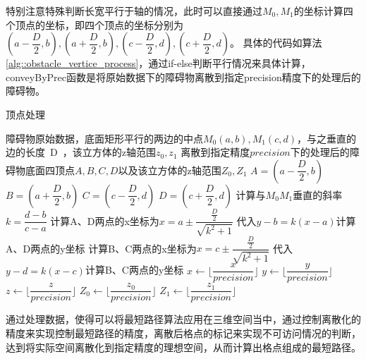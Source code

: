\par 特别注意特殊判断长宽平行于轴的情况，此时可以直接通过$M_0,M_1$的坐标计算四个顶点的坐标，即四个顶点的坐标分别为$(a-\dfrac{D}{2},b),(a+\dfrac{D}{2},b),(c-\dfrac{D}{2},d),(c+\dfrac{D}{2},d)$。
具体的代码如算法\ref{alg::obstacle_vertice_process}，通过if-else判断平行情况来具体计算，conveyByPrec函数是将原始数据下的障碍物离散到指定precision精度下的处理后的障碍物。
%
\begin{algorithm}[!htb]
    \caption{顶点处理}
    \label{alg::obstacle_vertice_process}
    \begin{algorithmic}[1] %
        \Require 障碍物原始数据，底面矩形平行的两边的中点$M_0(a,b),M_1(c,d)$，与之垂直的边的长度~D~，该立方体的z轴范围$z_0,z_1$
        \Ensure 离散到指定精度$precision$下的处理后的障碍物底面四顶点$A,B,C,D$以及该立方体的z轴范围$Z_0,Z_1$
                \State $A = (a-\dfrac{D}{2}, b)$
                \State $B = (a+\dfrac{D}{2}, b)$
                \State $C = (c-\dfrac{D}{2}, d)$
                \State $D = (c+\dfrac{D}{2}, d)$
            \Else
                \State 计算与$M_0M_1$垂直的斜率$k=\dfrac{d-b}{c-a}$
                \State 计算A、D两点的x坐标为$x=a\pm\dfrac{\frac{D}{2}}{\sqrt{k^2+1}}$
                \State 代入$y-b=k(x-a)$计算A、D两点的y坐标
                \State 计算B、C两点的x坐标为$x=c\pm\dfrac{\frac{D}{2}}{\sqrt{k^2+1}}$
                \State 代入$y-d=k(x-c)$计算B、C两点的y坐标
            \EndIf
            \State \Return{}
        \EndFunction
        \State
                \State $x \gets \lfloor\dfrac{x}{precision}\rfloor$
                \State $y \gets \lfloor\dfrac{y}{precision}\rfloor$
                \State $z \gets \lfloor\dfrac{z}{precision}\rfloor$
            \EndWhile
            \State $Z_0 \gets \lfloor\dfrac{z_0}{precision}\rfloor$
            \State $Z_1 \gets \lfloor\dfrac{z_1}{precision}\rfloor$
            \State {}
        \EndFunction
    \end{algorithmic}
\end{algorithm}

\par 通过处理数据，使得可以将最短路径算法应用在三维空间当中，通过控制离散化的精度来实现控制最短路径的精度，离散后格点的标记来实现不可访问情况的判断，达到将实际空间离散化到指定精度的理想空间，从而计算出格点组成的最短路径。

